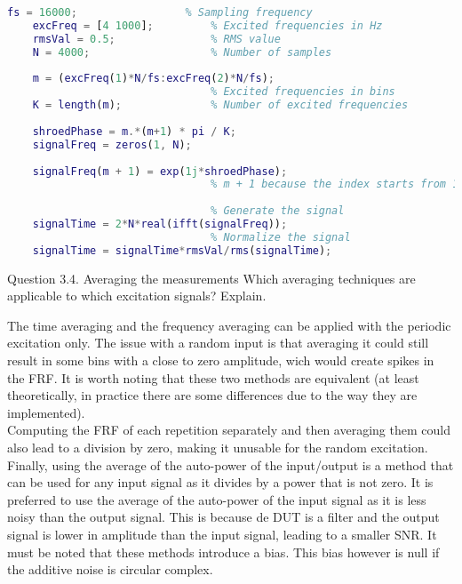 \begin{lstlisting}[language=Matlab, basicstyle=\ttfamily\footnotesize, keywordstyle=\color{blue}, commentstyle=\color{darkerGreen}, stringstyle=\color{red}]
    fs = 16000;                 % Sampling frequency
    excFreq = [4 1000];         % Excited frequencies in Hz
    rmsVal = 0.5;               % RMS value
    N = 4000;                   % Number of samples
    
    m = (excFreq(1)*N/fs:excFreq(2)*N/fs); 
                                % Excited frequencies in bins
    K = length(m);              % Number of excited frequencies
    
    shroedPhase = m.*(m+1) * pi / K;
    signalFreq = zeros(1, N);
    
    signalFreq(m + 1) = exp(1j*shroedPhase);
                                % m + 1 because the index starts from 1 in MATLAB
    
                                % Generate the signal
    signalTime = 2*N*real(ifft(signalFreq)); 
                                % Normalize the signal
    signalTime = signalTime*rmsVal/rms(signalTime); 
\end{lstlisting}


\begin{Task}{Question 3.4. Averaging the measurements}
    Which averaging techniques are applicable to which excitation signals? Explain.
\end{Task}

The time averaging and the frequency averaging can be applied with the periodic excitation only. The issue with a random input is that averaging it could still result in some bins with a close to zero amplitude, wich would create spikes in the FRF. It is worth noting that these two methods are equivalent (at least theoretically, in practice there are some differences due to the way they are implemented).\\

Computing the FRF of each repetition separately and then averaging them could also lead to a division by zero, making it unusable for the random excitation.\\

Finally, using the average of the auto-power of the input/output is a method that can be used for any input signal as it divides by a power that is not zero. It is preferred to use the average of the auto-power of the input signal as it is less noisy than the output signal. This is because de DUT is a filter and the output signal is lower in amplitude than the input signal, leading to a smaller SNR. It must be noted that these methods introduce a bias. This bias however is null if the additive noise is circular complex.
\normalsize

